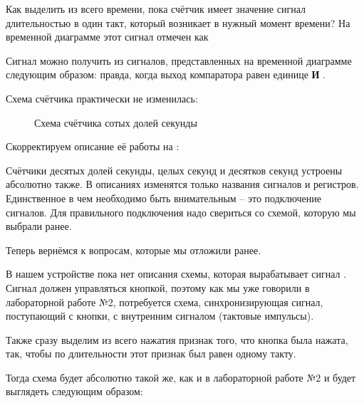\par{Как выделить из всего времени, пока счётчик имеет значение  сигнал длительностью в один такт, который возникает в нужный момент времени? На временной диаграмме этот сигнал отмечен как 

\par{Сигнал  можно получить из сигналов, представленных на временной диаграмме следующим образом:  правда, когда выход компаратора равен единице \textbf{И} .}

\par{Схема счётчика практически не изменилась:}

\begin{figure}[H]
	\centering
	\def\svgwidth{\columnwidth}
	
	\caption{Схема счётчика сотых долей секунды}
\end{figure}

\par{Скорректируем описание её работы на :}



\par{Счётчики десятых долей секунды, целых секунд и десятков секунд устроены абсолютно также. В описаниях изменятся только названия сигналов и регистров. Единственное в чем необходимо быть внимательным – это подключение сигналов. Для правильного подключения надо свериться со схемой, которую мы выбрали ранее.}

\par{Теперь вернёмся к вопросам, которые мы отложили ранее.}

\par{В нашем устройстве пока нет описания схемы, которая вырабатывает сигнал . Сигнал должен управляться кнопкой, поэтому как мы уже говорили в лабораторной работе №2, потребуется схема, синхронизирующая сигнал, поступающий с кнопки, с внутренним сигналом  (тактовые импульсы).}

\par{Также сразу выделим из всего нажатия признак того, что кнопка была нажата, так, чтобы по длительности этот признак был равен одному такту.}

\par{Тогда схема будет абсолютно такой же, как и в лабораторной работе №2 и будет выглядеть следующим образом:}

}
